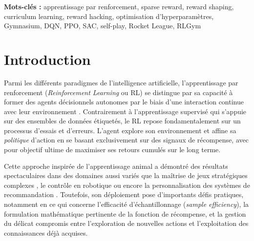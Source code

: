 \documentclass[a4paper, 11pt]{article}
\begin{document}
\vspace{1em}
\noindent\textbf{Mots-clés :} %
apprentissage par renforcement, sparse reward, reward shaping, curriculum learning, reward hacking, optimisation d'hyperparamètres, Gymnasium, DQN, PPO, SAC, self-play, Rocket League, RLGym


\newpage
\tableofcontents

\newpage
\listoftables

\newpage
\listoffigures

\newpage
{}
\setcounter{page}{1}


\section{Introduction}

Parmi les différents paradigmes de l'intelligence artificielle, l'apprentissage par renforcement (\textit{Reinforcement Learning} ou RL) se distingue par sa capacité à former des agents décisionnels autonomes par le biais d'une interaction continue avec leur environnement \parencite{suttonReinforcementLearningIntroduction2018}. Contrairement à l'apprentissage supervisé qui s'appuie sur des ensembles de données étiquetés, le RL repose fondamentalement sur un processus d'essais et d'erreurs. L'agent explore son environnement et affine sa \textit{politique} d'action en se basant exclusivement sur des signaux de récompense, avec pour objectif ultime de maximiser ses retours cumulés sur le long terme.

Cette approche inspirée de l'apprentissage animal a démontré des résultats spectaculaires dans des domaines aussi variés que la maîtrise de jeux stratégiques complexes \parencite{silverMasteringGameGo2017,openaiDota2Large2019}, le contrôle en robotique \parencite{tangDeepReinforcementLearning2024} ou encore la personnalisation des systèmes de recommandation \parencite{iftikharReinforcementLearningRecommender2024}. Toutefois, son déploiement pose d'importants défis pratiques, notamment en ce qui concerne l'efficacité d'échantillonnage (\textit{sample efficiency}), la formulation mathématique pertinente de la fonction de récompense, et la gestion du délicat compromis entre l'exploration de nouvelles actions et l'exploitation des connaissances déjà acquises.
\end{document}
